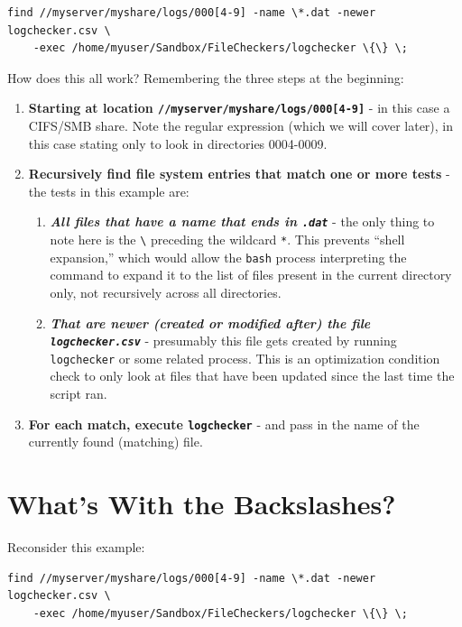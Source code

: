 \documentclass[10pt,]{book}
\numberwithin{figure}{chapter}
\begin{document}
\begin{verbatim}
find //myserver/myshare/logs/000[4-9] -name \*.dat -newer logchecker.csv \
    -exec /home/myuser/Sandbox/FileCheckers/logchecker \{\} \;
\end{verbatim}

How does this all work? Remembering the three steps at the beginning:

\begin{enumerate}
\def\labelenumi{\arabic{enumi}.}
\item
  \textbf{Starting at location
  \texttt{//myserver/myshare/logs/000{[}4-9{]}}} - in this case a
  CIFS/SMB share. Note the regular expression (which we will cover
  later), in this case stating only to look in directories 0004-0009.
\item
  \textbf{Recursively find file system entries that match one or more
  tests} - the tests in this example are:

  \begin{enumerate}
  \def\labelenumii{\alph{enumii}.}
  \item
    \textbf{\emph{All files that have a name that ends in
    \texttt{.dat}}} - the only thing to note here is the
    \texttt{\textbackslash{}} preceding the wildcard \texttt{*}. This
    prevents ``shell expansion,'' which would allow the \texttt{bash}
    process interpreting the command to expand it to the list of files
    present in the current directory only, not recursively across all
    directories.
  \item
    \textbf{\emph{That are newer (created or modified after) the file
    \texttt{logchecker.csv}}} - presumably this file gets created by
    running \texttt{logchecker} or some related process. This is an
    optimization condition check to only look at files that have been
    updated since the last time the script ran.
  \end{enumerate}
\item
  \textbf{For each match, execute \texttt{logchecker}} - and pass in the
  name of the currently found (matching) file.
\end{enumerate}

\section{What's With the Backslashes?}\label{whats-with-the-backslashes}

Reconsider this example:

\begin{verbatim}
find //myserver/myshare/logs/000[4-9] -name \*.dat -newer logchecker.csv \
    -exec /home/myuser/Sandbox/FileCheckers/logchecker \{\} \;
\end{verbatim}
\end{document}
